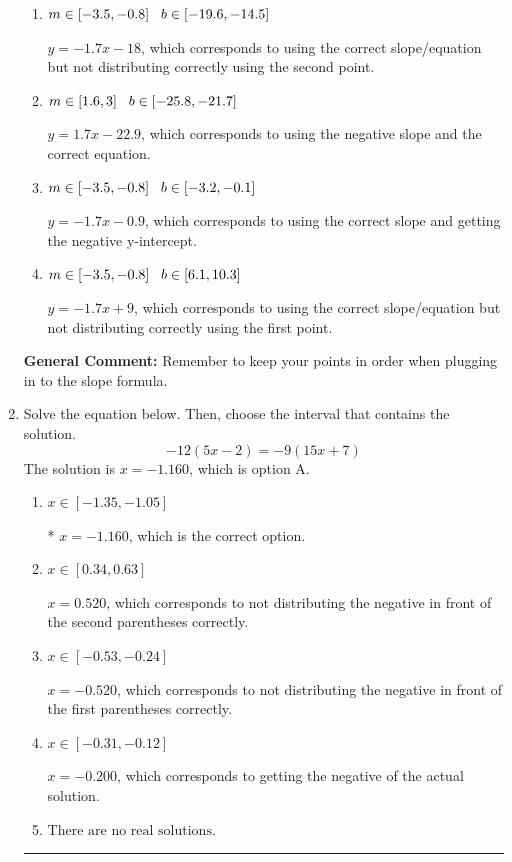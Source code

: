 \documentclass{extbook}[14pt]
\newcommand{\litem}[1]{\item #1

\rule{\textwidth}{0.4pt}}
\begin{document}
\begin{enumerate}
{\begin{enumerate}[label=\Alph*.]
* $y = -1.7x + 0.9$, which is the correct option.
\item \( m \in [-3.5, -0.8] \hspace*{3mm} b \in [-19.6, -14.5] \)

 $y = -1.7x -18$, which corresponds to using the correct slope/equation but not distributing correctly using the second point.
\item \( m \in [1.6, 3] \hspace*{3mm} b \in [-25.8, -21.7] \)

 $y = 1.7x -22.9$, which corresponds to using the negative slope and the correct equation.
\item \( m \in [-3.5, -0.8] \hspace*{3mm} b \in [-3.2, -0.1] \)

 $y = -1.7x -0.9$, which corresponds to using the correct slope and getting the negative y-intercept.
\item \( m \in [-3.5, -0.8] \hspace*{3mm} b \in [6.1, 10.3] \)

 $y = -1.7x + 9$, which corresponds to using the correct slope/equation but not distributing correctly using the first point.
\end{enumerate}

\textbf{General Comment:} Remember to keep your points in order when plugging in to the slope formula.
}
\litem{
Solve the equation below. Then, choose the interval that contains the solution.
\[ -12(5x -2) = -9(15x + 7) \]The solution is \( x = -1.160 \), which is option A.\begin{enumerate}[label=\Alph*.]
\item \( x \in [-1.35, -1.05] \)

* $x = -1.160$, which is the correct option.
\item \( x \in [0.34, 0.63] \)

$x = 0.520$, which corresponds to not distributing the negative in front of the second parentheses correctly.
\item \( x \in [-0.53, -0.24] \)

$x = -0.520$, which corresponds to not distributing the negative in front of the first parentheses correctly.
\item \( x \in [-0.31, -0.12] \)

$x = -0.200$, which corresponds to getting the negative of the actual solution.
\item \( \text{There are no real solutions.} \)


\end{enumerate}}
\end{enumerate}
\end{document}
